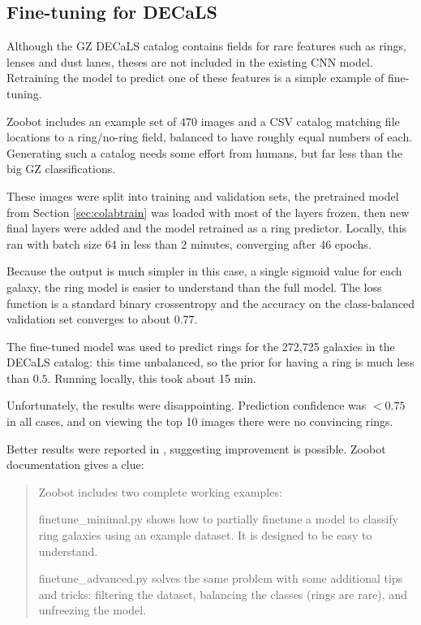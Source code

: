 \documentclass[preprint]{aastex631}
\begin{document}
\subsection{Fine-tuning for DECaLS}

Although the GZ DECaLS catalog contains fields for rare features such as rings, lenses and dust lanes, theses are not included in the existing CNN model. Retraining the model to predict one of these features is a simple example of fine-tuning.

Zoobot includes an example set of 470 images and a CSV catalog matching file locations to a ring/no-ring field, balanced to have roughly equal numbers of each. Generating such a catalog needs some effort from humans, but far less than the big GZ classifications. 

These images were split into training and validation sets, the pretrained model from Section \ref{sec:colabtrain} was loaded with most of the layers frozen, then new final layers were added and the model retrained as a ring predictor. Locally, this ran with batch size 64 in less than 2 minutes, converging after 46 epochs.

Because the output is much simpler in this case, a single sigmoid value for each galaxy, the ring model is easier to understand than the full model. The loss function is a standard binary crossentropy and the accuracy on the class-balanced validation set converges to about 0.77.

The fine-tuned model was used to predict rings for the 272,725 galaxies in the DECaLS catalog: this time unbalanced, so the prior for having a ring is much less than $0.5$. Running locally, this took about 15 min.

Unfortunately, the results were disappointing. Prediction confidence was $<0.75$ in all cases, and on viewing the top 10 images there were no convincing rings.

Better results were reported in \citet{walmsley_galaxy_2022}, suggesting improvement is possible. Zoobot documentation gives a clue:

\begin{quote}
	 Zoobot includes two complete working examples:

finetune\_minimal.py shows how to partially finetune a model to classify ring galaxies using an example dataset. It is designed to be easy to understand.

finetune\_advanced.py solves the same problem with some additional tips and tricks: filtering the dataset, balancing the classes (rings are rare), and unfreezing the model.
\end{quote}
\end{document}
